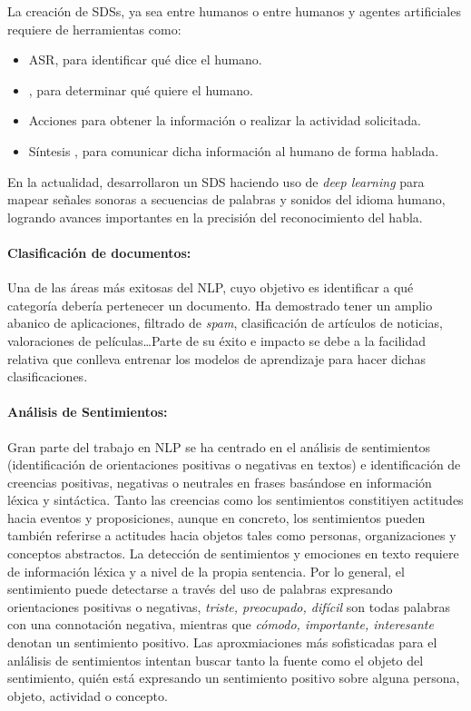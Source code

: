 La creación de \acp{SDS}, ya sea entre humanos o entre humanos y agentes
artificiales requiere de herramientas como:
\begin{itemize}
\item \ac{ASR}, para identificar qué dice el humano.
\item {}, para
  determinar qué quiere el humano.
\item Acciones para obtener la información o realizar la actividad
  solicitada.
\item Síntesis , para comunicar dicha información al humano de forma hablada.
\end{itemize} En la actualidad, \citet{microsoft:sds} desarrollaron un \ac{SDS}
haciendo uso de \emph{deep learning} para mapear señales sonoras a secuencias de
palabras y sonidos del idioma humano, logrando avances importantes en la
precisión del reconocimiento del habla.

\paragraph{Clasificación de documentos:} Una de las áreas más exitosas del
\ac{NLP}, cuyo objetivo es identificar a qué categoría debería pertenecer un
documento. Ha demostrado tener un amplio abanico de aplicaciones, \eg filtrado
de \emph{spam}, clasificación de artículos de noticias, valoraciones de
películas\dots Parte de su éxito e impacto se debe a la facilidad relativa que
conlleva entrenar los modelos de aprendizaje para hacer dichas clasificaciones.

\paragraph{Análisis de Sentimientos:} Gran parte del trabajo en \ac{NLP} se ha
centrado en el análisis de sentimientos (identificación de orientaciones
positivas o negativas en textos) e identificación de creencias positivas,
negativas o neutrales en frases basándose en información léxica y
sintáctica. Tanto las creencias como los sentimientos constitiyen actitudes
hacia eventos y proposiciones, aunque en concreto, los sentimientos pueden
también referirse a actitudes hacia objetos tales como personas, organizaciones
y conceptos abstractos. La detección de sentimientos y emociones en texto
requiere de información léxica y a nivel de la propia sentencia. Por lo general,
el sentimiento puede detectarse a través del uso de palabras expresando
orientaciones positivas o negativas, \eg \emph{triste, preocupado, difícil} son
todas palabras con una connotación negativa, mientras que \emph{cómodo,
  importante, interesante} denotan un sentimiento positivo. Las aproxmiaciones
más sofisticadas para el anlálisis de sentimientos intentan buscar tanto la
fuente como el objeto del sentimiento, \eg quién está expresando un sentimiento
positivo sobre alguna persona, objeto, actividad o concepto.

